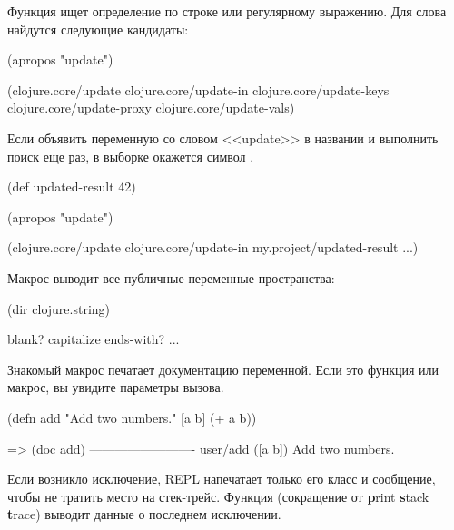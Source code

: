 Функция  ищет определение по строке или регулярному выражению. Для слова  найдутся следующие кандидаты:

\begin{english}
  \begin{clojure}
(apropos "update")

(clojure.core/update
 clojure.core/update-in
 clojure.core/update-keys
 clojure.core/update-proxy
 clojure.core/update-vals)
  \end{clojure}
\end{english}

Если объявить переменную со словом <<update>> в названии и выполнить поиск еще раз, в выборке окажется символ .

\begin{english}
  \begin{clojure}
(def updated-result 42)

(apropos "update")

(clojure.core/update
 clojure.core/update-in
 my.project/updated-result
 ...)
  \end{clojure}
\end{english}

Макрос  выводит все публичные переменные пространства:

\begin{english}
  \begin{clojure}
(dir clojure.string)

blank?
capitalize
ends-with?
...
  \end{clojure}
\end{english}

Знакомый макрос  печатает документацию переменной. Если это функция или макрос, вы увидите параметры вызова.

\begin{english}
  \begin{clojure}
(defn add
  "Add two numbers."
  [a b]
  (+ a b))

=> (doc add)
-------------------------
user/add
([a b])
  Add two numbers.
  \end{clojure}
\end{english}

Если возникло исключение, REPL напечатает только его класс и сообщение, чтобы не тратить место на стек-трейс. Функция  (сокращение от \textbf{p}rint \textbf{s}tack \textbf{t}race) выводит данные о последнем исключении.

